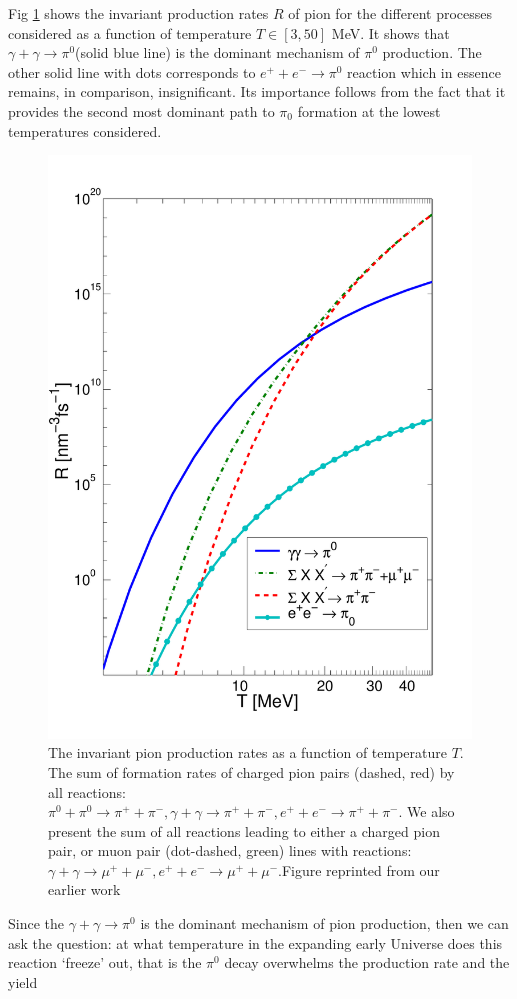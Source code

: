 \documentclass[universe,article,submit,moreauthors,pdftex,a4paper]{Definitions/mdpi}
\begin{document}
Fig \ref{taumupi} shows the invariant production rates $R$ of pion  for the different processes considered as a function of temperature $T\in [3,50]$ MeV. It shows that $\gamma+\gamma\to \pi^0$(solid blue line) is the dominant mechanism of $\pi^0$ production. The other solid line with dots corresponds to $e^++e^-\to \pi^0$ reaction which in essence remains, in comparison, insignificant. Its importance follows from the fact that it provides the second most dominant path to $\pi_0$ formation at the lowest temperatures considered.
\begin{figure}[h]
\centering
\includegraphics[width=0.6\columnwidth]{pions1.pdf}
\caption{The invariant pion production rates as a function of temperature $T$. The sum of formation rates of charged pion pairs (dashed, red) by all reactions: $\pi^{0}+\pi^{0}\to \pi^{+}+\pi^{-},  \gamma+\gamma \to \pi^{+}+\pi^{-}, e^++e^-\to \pi^{+}+\pi^{-}$.
We also present the sum of all reactions leading to either a charged pion pair, or muon pair (dot-dashed, green) lines with reactions:$\gamma+\gamma \to \mu^{+}+\mu^{-}, e^++e^-\to \mu^{+}+\mu^{-}$.Figure reprinted from our earlier work \cite{Kuznetsova:2008jt}}
\label{taumupi}
\end{figure}
Since the  $\gamma+\gamma\to \pi^0$ is the dominant mechanism of pion production, then we can ask the question: at what temperature in the expanding early Universe does this reaction
`freeze' out, that is the $\pi^0$ decay overwhelms the production rate and the yield
\end{document}
